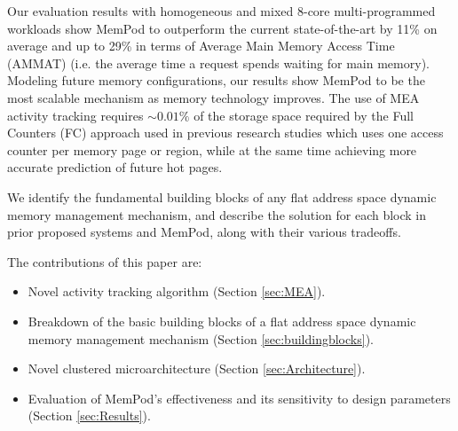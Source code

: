 Our evaluation results with homogeneous and mixed 8-core multi-programmed workloads show MemPod to outperform the current state-of-the-art by 11\% on average and up to 29\% in terms of Average Main Memory Access Time (AMMAT) (i.e. the average time a request spends waiting for main memory). Modeling future memory configurations, our results show MemPod to be the most scalable mechanism as memory technology improves. The use of MEA activity tracking requires $\sim0.01\%$ of the storage space required by the Full Counters (FC) approach used in previous research studies which uses one access counter per memory page or region, while at the same time achieving more accurate prediction
of future hot pages.

We identify the fundamental building blocks of any flat address space dynamic 
memory management mechanism, and describe the solution for each block in 
prior proposed systems and MemPod, along with their various tradeoffs. 


The contributions of this paper are:

\begin{itemize}
\setlength\itemsep{0em}
\item Novel activity tracking algorithm (Section \ref{sec:MEA}).
\item Breakdown of the basic building blocks of a flat address space dynamic memory management mechanism (Section \ref{sec:buildingblocks}).
\item Novel clustered microarchitecture (Section \ref{sec:Architecture}).
\item Evaluation of MemPod's effectiveness and its sensitivity to design parameters (Section \ref{sec:Results}).
\end{itemize}